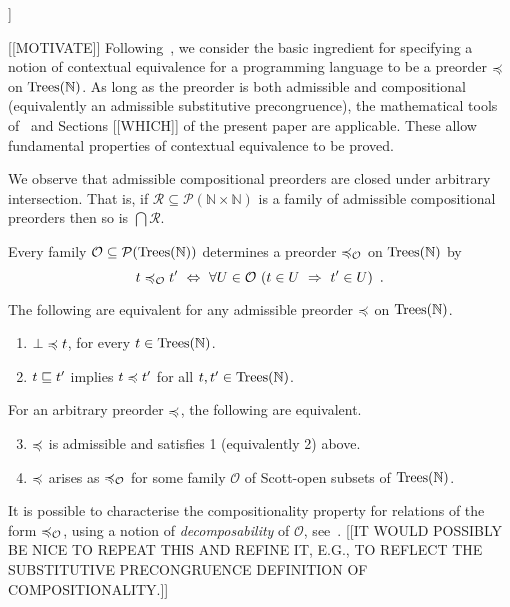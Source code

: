 \noindent
[[INSERT EASY PROOF (AT LEAST IN OUTLINE). IN PROOF NOTE THAT 1 ONLY REQUIRES REFLEXIVITY.]]


[[MOTIVATE]]
Following~\cite{gom}, we consider the basic ingredient for specifying  a notion of
contextual equivalence for a programming language to be a preorder $\preccurlyeq$ on $\textnormal{Trees}(\mathbb{N})$.
As long as the preorder is both admissible and compositional (equivalently an admissible substitutive precongruence), the mathematical tools of~\cite{gom} and Sections [[WHICH]] of the present paper are applicable. These allow fundamental properties of contextual equivalence to be proved.

We observe that admissible compositional preorders are closed under arbitrary intersection. That is, if
$\mathcal{R} \subseteq \mathcal{P}(\mathbb{N} \times \mathbb{N})$ is a family of admissible compositional preorders
then so is $\bigcap \mathcal{R}$.

Every family $\mathcal{O} \subseteq \mathcal{P}(\textnormal{Trees}(\mathbb{N}))$ determines a preorder $\preccurlyeq_\mathcal{O}$ on 
$\textnormal{Trees}(\mathbb{N})$ by
\begin{equation}
\label{equation:observational-preorder}
t \preccurlyeq_\mathcal{O} t' ~ \Leftrightarrow ~ \forall U \in \mathcal{O}~ (t \in U ~ \Rightarrow ~ t' \in U) \enspace .
\end{equation}

\begin{aproposition} 
The following are equivalent for
any admissible  preorder  $\preccurlyeq$ on $\textnormal{Trees}(\mathbb{N})$.
\begin{enumerate} 
\item $\bot \preccurlyeq t$,  for every $t \in \textnormal{Trees}(\mathbb{N})$.
\item $t \sqsubseteq t'$ implies $t \preccurlyeq t'$ for all $t,t' \in \textnormal{Trees}(\mathbb{N})$.
\end{enumerate}
For an arbitrary preorder $\preccurlyeq$, the following are equivalent.
\begin{enumerate}
\setcounter{enumi}{2}
\item $\preccurlyeq$ is admissible and satisfies 1 (equivalently 2) above.
\item $\preccurlyeq$ arises as $\preccurlyeq_\mathcal{O}$ for some family $\mathcal{O}$ of Scott-open subsets
of $\textnormal{Trees}(\mathbb{N})$.
\end{enumerate}
\end{aproposition}

It is possible to characterise the compositionality property for relations of the form $\preccurlyeq_\mathcal{O}$, using a notion of \emph{decomposability} of $\mathcal{O}$, see~\cite{gom}. 
[[IT WOULD POSSIBLY BE NICE TO REPEAT THIS AND REFINE IT, E.G., TO REFLECT THE SUBSTITUTIVE PRECONGRUENCE DEFINITION OF COMPOSITIONALITY.]]



